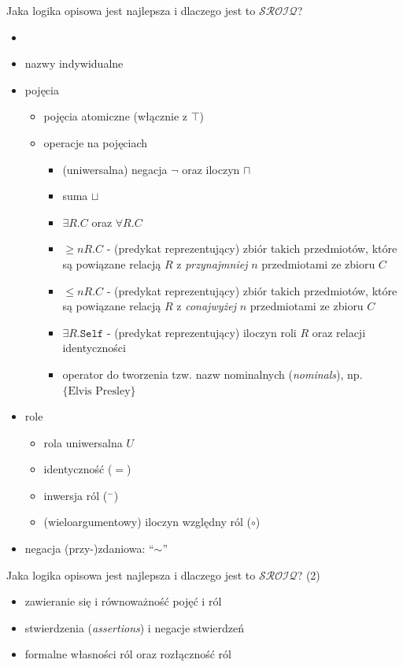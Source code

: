 \documentclass{beamer}
\begin{document}
\begin{frame}[shrink=0.8]{Jaka logika opisowa jest najlepsza i dlaczego jest to $\mathcal{SROIQ}$?}
%
\begin{itemize}
\item \cite{conf/kr/HorrocksKS06}
%
\item nazwy indywidualne
%
\item pojęcia
\begin{itemize}
\item pojęcia atomiczne (włącznie z $\top$)
%
\item operacje na pojęciach
\begin{itemize}
\item (uniwersalna) negacja $\neg$ oraz iloczyn $\sqcap$
\item suma $\sqcup$
\item $\exists R. C$ oraz $\forall R.C$
\item $\geq n R . C$ - (predykat reprezentujący) zbiór takich przedmiotów, które są powiązane relacją $R$ z \emph{przynajmniej} $n$ przedmiotami ze zbioru $C$
\item $\leq n R . C$ - (predykat reprezentujący) zbiór takich przedmiotów, które są powiązane relacją $R$ z \emph{conajwyżej} $n$ przedmiotami ze zbioru $C$
\item $\exists R.\texttt{Self}$ - (predykat reprezentujący) iloczyn roli $R$ oraz relacji identyczności
\item operator do tworzenia tzw. nazw nominalnych (\emph{nominals}), np. $\{\text{Elvis Presley}\}$ 
\end{itemize}
\end{itemize}
%
\item role
\begin{itemize}
\item rola uniwersalna $U$
\item identyczność ($=$)
\item inwersja ról ($^{-}$)
\item (wieloargumentowy) iloczyn względny ról ($\circ$)
\end{itemize}
%
\item negacja (przy-)zdaniowa: ``$\sim$''
\end{itemize}
\end{frame}

\begin{frame}{Jaka logika opisowa jest najlepsza i dlaczego jest to $\mathcal{SROIQ}$? (2)}
%
\begin{itemize}
\item zawieranie się i równoważność pojęć i ról
\item stwierdzenia (\emph{assertions}) i negacje stwierdzeń
\item formalne własności ról oraz rozłączność ról
\end{itemize}
\end{frame}
\end{document}
